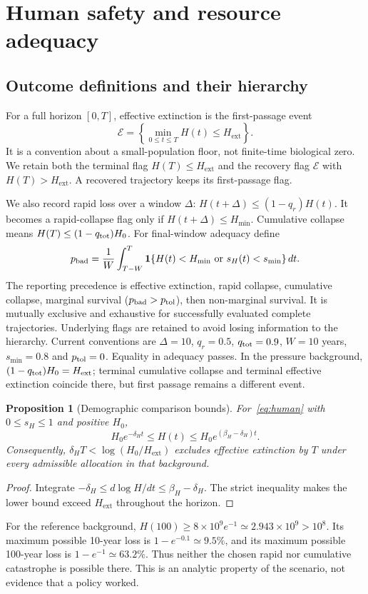 \documentclass[12pt,a4paper]{article}
\newtheorem{proposition}{Proposition}[section]
\theoremstyle{remark}
\newcommand{\ind}{\mathbf{1}}
\newcommand{\Hext}{H_{\mathrm{ext}}}
\newcommand{\Hmin}{H_{\min}}
\begin{document}
\section{Human safety and resource adequacy}\label{sec:safety}
\subsection{Outcome definitions and their hierarchy}
For a full horizon $[0,T]$, effective extinction is the first-passage event
\begin{equation}\label{eq:ext}
\mathcal E=\left\{\min_{0\le t\le T}H(t)\le\Hext\right\}.
\end{equation}
It is a convention about a small-population floor, not finite-time biological zero. We retain both the terminal flag $H(T)\le\Hext$ and the recovery flag $\mathcal E$ with $H(T)>\Hext$. A recovered trajectory keeps its first-passage flag.

We also record rapid loss over a window $\Delta$: $H(t+\Delta)\le(1-q_r)H(t)$. It becomes a rapid-collapse flag only if $H(t+\Delta)\le\Hmin$. Cumulative collapse means $H(T)\le(1-q_{\rm tot})H_0$. For final-window adequacy define
\begin{equation}\label{eq:pbad}
p_{\rm bad}=\frac1W\int_{T-W}^{T}\ind\{H(t)<\Hmin\ \text{or}\ s_H(t)<s_{\min}\}\,dt.
\end{equation}
The reporting precedence is effective extinction, rapid collapse, cumulative collapse, marginal survival ($p_{\rm bad}>p_{\rm tol}$), then non-marginal survival. It is mutually exclusive and exhaustive for successfully evaluated complete trajectories. Underlying flags are retained to avoid losing information to the hierarchy. Current conventions are $\Delta=10$, $q_r=0.5$, $q_{\rm tot}=0.9$, $W=10$ years, $s_{\min}=0.8$ and $p_{\rm tol}=0$. Equality in adequacy passes. In the pressure background, $(1-q_{\rm tot})H_0=\Hext$; terminal cumulative collapse and terminal effective extinction coincide there, but first passage remains a different event.

\begin{proposition}[Demographic comparison bounds]\label{prop:bounds}
For~\eqref{eq:human} with $0\le s_H\le1$ and positive $H_0$,
\begin{equation}\label{eq:bounds}
H_0e^{-\delta_Ht}\le H(t)\le H_0e^{(\beta_H-\delta_H)t}.
\end{equation}
Consequently, $\delta_HT<\log(H_0/\Hext)$ excludes effective extinction by $T$ under every admissible allocation in that background.
\end{proposition}
\begin{proof}
Integrate $-\delta_H\le d\log H/dt\le\beta_H-\delta_H$. The strict inequality makes the lower bound exceed $\Hext$ throughout the horizon.
\end{proof}
For the reference background, $H(100)\ge8\times10^9e^{-1}\simeq2.943\times10^9>10^8$. Its maximum possible 10-year loss is $1-e^{-0.1}\simeq9.5\%$, and its maximum possible 100-year loss is $1-e^{-1}\simeq63.2\%$. Thus neither the chosen rapid nor cumulative catastrophe is possible there. This is an analytic property of the scenario, not evidence that a policy worked.
\end{document}
